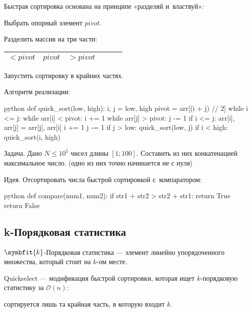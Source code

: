 {\bold Быстрая сортировка} основана на принципе {\ital «разделяй и~властвуй»}:
\begin{list*}[][\#]
\item Выбрать опорный элемент $pivot$.
\item Разделить массив на три части:

{\centering
\begin{tabular}{|Sc|Sc|Sc|}
\hline
$\less pivot$ & $pivot$ & $\greater pivot$\\\hline
\end{tabular}\par}
\item Запустить сортировку в крайних частях.
\end{list*}

{\bold Алгоритм} реализации:
\begin{code}{python}
def quick_sort(low, high):
  i, j = low, high
  pivot = arr[(i + j) // 2]
  while i <= j:
    while arr[i] < pivot:
      i += 1
    while arr[j] > pivot:
      j -= 1
    if i <= j:
      arr[i], arr[j] = arr[j], arr[i]
      i += 1
      j -= 1
  if j > low:
    quick_sort(low, j)
  if i < high:
    quick_sort(i, high)
\end{code}

\begin{theorem}
{\bold Задача.} Дано $N\leq 10^5$ чисел длины $[1;100]$. Составить из них конкатенацией максимальное число. {\ital\color{desc}(одно из них точно начинается не с нуля)}
\end{theorem}
{\bold Идея.} Отсортировать числа быстрой сортировкой с~{\ital компаратором}:
\begin{code}{python}
def compare(num1, num2):
  if str1 + str2 > str2 + str1:
    return True
  return False
\end{code}

\subsection{k-Порядковая статистика}

{\bold $\symbfit{k}$-Порядковая статистика} --- элемент линейно упорядоченного множества, который стоит на $k$-ом месте.

{\bold Quickselect} --- модификация {\ital быстрой сортировки}, которая ищет $k$-порядковую статистику за $\mathcal{O}(n)$:
\begin{list*}
\item сортируется лишь та крайная часть, в которую входит $k$.
\end{list*}

